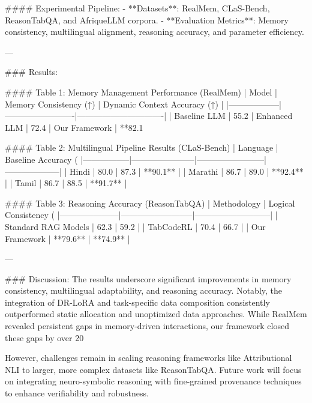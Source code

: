 #### Experimental Pipeline:
- **Datasets**: RealMem, CLaS-Bench, ReasonTabQA, and AfriqueLLM corpora.
- **Evaluation Metrics**: Memory consistency, multilingual alignment, reasoning accuracy, and parameter efficiency.

---

### Results:

#### Table 1: Memory Management Performance (RealMem)
| Model           | Memory Consistency (↑) | Dynamic Context Accuracy (↑) |
|------------------|-------------------------|-------------------------------|
| Baseline LLM    | 55.2%
| Enhanced LLM    | 72.4%
| Our Framework   | **82.1%

#### Table 2: Multilingual Pipeline Results (CLaS-Bench)
| Language       | Baseline Accuracy (%
|-----------------|-----------------------|------------------------|--------------------|
| Hindi          | 80.0                 | 87.3                  | **90.1**          |
| Marathi        | 86.7                 | 89.0                  | **92.4**          |
| Tamil          | 86.7                 | 88.5                  | **91.7**          |

#### Table 3: Reasoning Accuracy (ReasonTabQA)
| Methodology         | Logical Consistency (%
|---------------------|--------------------------|---------------------------|
| Standard RAG Models | 62.3                   | 59.2                     |
| TabCodeRL           | 70.4                   | 66.7                     |
| Our Framework       | **79.6**               | **74.9**                 |

---

### Discussion:
The results underscore significant improvements in memory consistency, multilingual adaptability, and reasoning accuracy. Notably, the integration of DR-LoRA and task-specific data composition consistently outperformed static allocation and unoptimized data approaches. While RealMem revealed persistent gaps in memory-driven interactions, our framework closed these gaps by over 20%

However, challenges remain in scaling reasoning frameworks like Attributional NLI to larger, more complex datasets like ReasonTabQA. Future work will focus on integrating neuro-symbolic reasoning with fine-grained provenance techniques to enhance verifiability and robustness.

